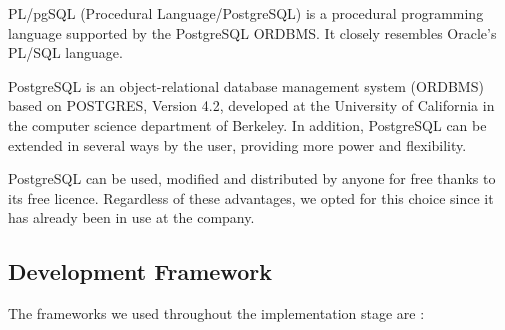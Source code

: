 PL/pgSQL (Procedural Language/PostgreSQL) is a procedural programming language supported by the PostgreSQL ORDBMS. It closely resembles Oracle's PL/SQL language.

PostgreSQL is an object-relational database management system (ORDBMS) based on POSTGRES, Version 4.2, developed at the University of California in the computer science department of Berkeley. 
In addition, PostgreSQL can be extended in several ways by the user, providing more power and flexibility.  \cite{postgres}

PostgreSQL can be used, modified and distributed by anyone for free thanks to its free licence. Regardless of these advantages, we opted for this choice since it has already been in use at the company.

\subsection{Development Framework}

The frameworks we used throughout the implementation stage are :

